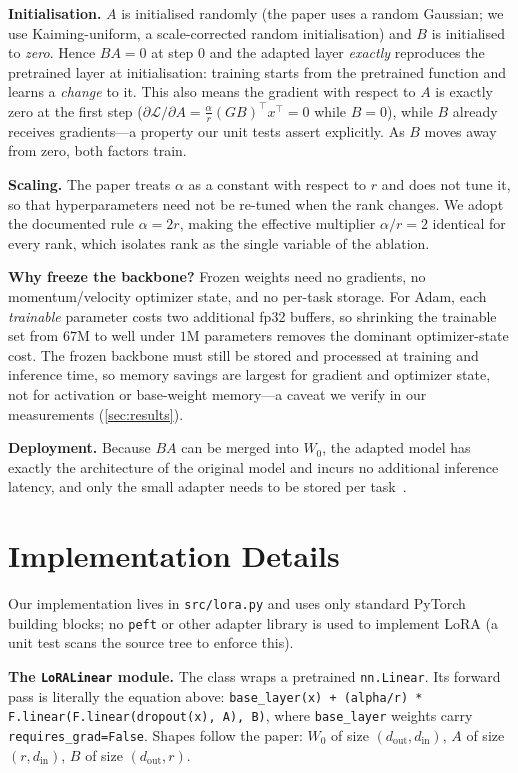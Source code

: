 \documentclass[conference]{IEEEtran}
\begin{document}
\textbf{Initialisation.} $A$ is initialised randomly (the paper uses a random
Gaussian; we use Kaiming-uniform, a scale-corrected random initialisation) and
$B$ is initialised to \emph{zero}. Hence $BA = 0$ at step 0 and the adapted
layer \emph{exactly} reproduces the pretrained layer at initialisation: training
starts from the pretrained function and learns a \emph{change} to it. This also
means the gradient with respect to $A$ is exactly zero at the first step
($\partial \mathcal{L}/\partial A = \frac{\alpha}{r}(G B)^{\!\top} x^{\!\top} = 0$
while $B=0$), while $B$ already receives gradients---a property our unit tests
assert explicitly. As $B$ moves away from zero, both factors train.

\textbf{Scaling.} The paper treats $\alpha$ as a constant with respect to $r$
and does not tune it, so that hyperparameters need not be re-tuned when the
rank changes. We adopt the documented rule $\alpha = 2r$, making the effective
multiplier $\alpha/r = 2$ identical for every rank, which isolates rank as the
single variable of the ablation.

\textbf{Why freeze the backbone?} Frozen weights need no gradients, no
momentum/velocity optimizer state, and no per-task storage. For Adam, each
\emph{trainable} parameter costs two additional fp32 buffers, so shrinking the
trainable set from $67$M to well under $1$M parameters removes the dominant
optimizer-state cost. The frozen backbone must still be stored and processed at
training and inference time, so memory savings are largest for gradient and
optimizer state, not for activation or base-weight memory---a caveat we verify
in our measurements (\cref{sec:results}).

\textbf{Deployment.} Because $BA$ can be merged into $W_0$, the adapted model
has exactly the architecture of the original model and incurs no additional
inference latency, and only the small adapter needs to be stored per
task~\cite{hu2022lora}.

\section{Implementation Details}
\label{sec:impl}
Our implementation lives in \texttt{src/lora.py} and uses only standard PyTorch
building blocks; no \texttt{peft} or other adapter library is used to implement
LoRA (a unit test scans the source tree to enforce this).

\textbf{The \texttt{LoRALinear} module.} The class wraps a pretrained
\texttt{nn.Linear}. Its forward pass is literally the equation above:
\texttt{base\_layer(x) + (alpha/r) * F.linear(F.linear(dropout(x), A), B)},
where \texttt{base\_layer} weights carry \texttt{requires\_grad=False}. Shapes
follow the paper: $W_0$ of size $(d_{\text{out}}, d_{\text{in}})$, $A$ of size
$(r, d_{\text{in}})$, $B$ of size $(d_{\text{out}}, r)$.
\end{document}
